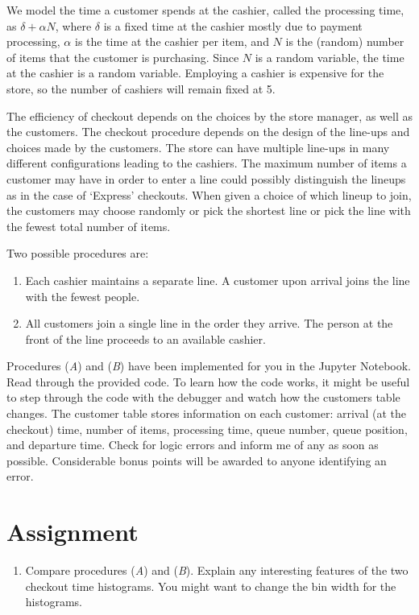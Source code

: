 \documentclass[letter]{article}
\begin{document}
We model the time a customer spends at the cashier, called the processing time, as $\delta + \alpha N$, where $\delta$ is a fixed time at the cashier mostly due to payment processing, $\alpha$ is the time at the cashier per item, and $N$ is the (random) number of items that the customer is purchasing. Since $N$ is a random variable, the time at the cashier is a random variable. Employing a cashier is expensive for the store, so the number of cashiers will remain fixed at 5.

The efficiency of checkout depends on the choices by the store manager, as well as the customers. The checkout procedure depends on the design of the line-ups and choices made by the customers. The store can have multiple line-ups in many different configurations leading to the cashiers. The maximum number of items a customer may have in order to enter a line could possibly distinguish the lineups as in the case of `Express' checkouts. When given a choice of which lineup to join, the customers may choose randomly or pick the shortest line or pick the line with the fewest total number of items.

Two possible procedures are:
\begin{enumerate}[label=(\textit{\Alph*})]
	\item Each cashier maintains a separate line. A customer upon arrival joins the line with the fewest people.
	\item All customers join a single line in the order they arrive. The person at the front of the line proceeds to an available cashier.
\end{enumerate}



Procedures (\textit{A}) and (\textit{B}) have been implemented for you in the Jupyter Notebook. Read through the provided code. To learn how the code works, it might be useful to step through the code with the debugger and watch how the customers table changes. The customer table stores information on each customer: arrival (at the checkout) time, number of items, processing time, queue number, queue position, and departure time. Check for logic errors and inform me of any as soon as possible. Considerable bonus points will be awarded to anyone identifying an error.

\section{Assignment}

\begin{enumerate}[label=\textbf{Task \arabic*.}]
	\item Compare procedures (\textit{A}) and (\textit{B}). Explain any interesting features of the two checkout time histograms. You might want to change the bin width for the histograms.
\end{enumerate} 
\end{document}
